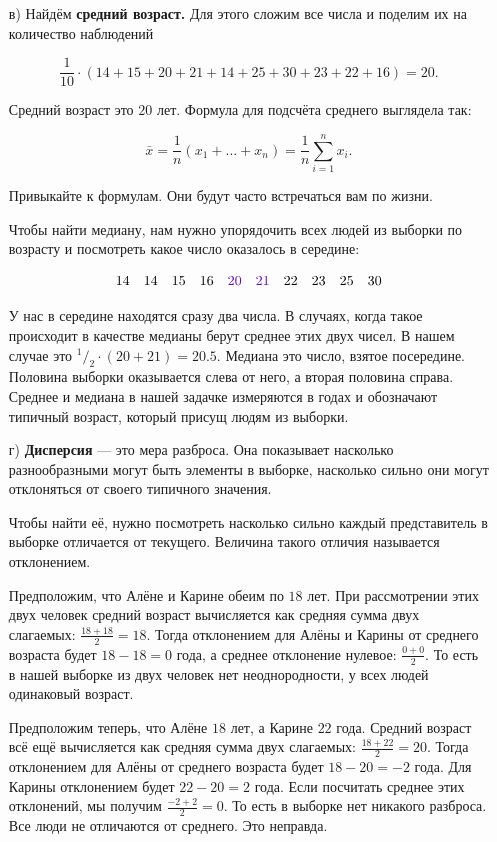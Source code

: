\documentclass[12pt, a4paper, oneside]{article}
\newcommand{\fr}[2]{\ensuremath{^{#1}/_{#2}}}   %
\theoremstyle{plain} %
\theoremstyle{definition}
\newcommand{\indef}[1]{\textbf{ \color{green} #1}}
\begin{document}
\begin{solution}
\begin{enumerate}
	\item[в)]  Найдём \indef{средний возраст.} Для этого сложим все числа и поделим их на количество наблюдений
	
	\[
	\frac{1}{10} \cdot (14 + 15 + 20 + 21 + 14 + 25 + 30 + 23 + 22 + 16) = 20.
	\]
	
	Средний возраст это $20$ лет.  Формула для подсчёта среднего выглядела так:
	
	\[
	\bar x = \frac{1}{n} (x_1 + \ldots + x_n) = \frac{1}{n} \sum_{i=1}^n x_i.
	\]
	
	Привыкайте к формулам. Они будут часто встречаться вам по жизни. 
	
	Чтобы найти медиану, нам нужно упорядочить всех людей из выборки по возрасту и посмотреть какое число оказалось в середине:
	
	\[
	14 \quad 14  \quad 15  \quad 16  \quad {\color{purp}{20}}  \quad {\color{purp}{21}}  \quad 22  \quad 23  \quad 25  \quad 30
	\]
	
	У нас в середине находятся сразу два числа. В случаях, когда такое происходит в качестве медианы берут среднее этих двух чисел. В нашем случае это $\fr{1}{2} \cdot (20 + 21) = 20.5$. Медиана это число, взятое посередине. Половина выборки оказывается слева от него, а вторая половина справа. Среднее и медиана в нашей задачке измеряются в годах и обозначают типичный возраст, который присущ людям из выборки. 
	
	\item[г)]  \indef{Дисперсия} --- это мера разброса. Она показывает насколько разнообразными могут быть элементы в выборке, насколько сильно они могут отклоняться от своего типичного значения. 
	
	Чтобы найти её, нужно посмотреть насколько сильно каждый представитель в выборке отличается от текущего. Величина такого отличия называется отклонением.
	
	Предположим, что Алёне и Карине обеим по $18$ лет. При рассмотрении этих двух человек средний возраст вычисляется как средняя сумма двух слагаемых: $\frac{18 + 18}{2} = 18$. Тогда отклонением для Алёны и Карины от среднего возраста будет $18 - 18 = 0$ года, а среднее отклонение нулевое: $\frac{0 + 0}{2}$. То есть в нашей выборке из двух человек нет неоднородности, у всех людей одинаковый возраст.
	
	Предположим теперь, что Алёне $18$ лет, а Карине $22$ года. Средний возраст всё ещё вычисляется как средняя сумма двух слагаемых: $\frac{18 + 22}{2} = 20$. Тогда отклонением для Алёны от среднего возраста будет $18 - 20 = -2$ года. Для Карины отклонением будет $22 - 20 = 2$ года. 
	Если посчитать среднее этих отклонений, мы получим $\frac{-2 + 2}{2} = 0$. То есть в выборке нет никакого разброса. Все люди не отличаются от среднего. Это неправда.
	

\end{enumerate}
\end{solution}
\end{document}
